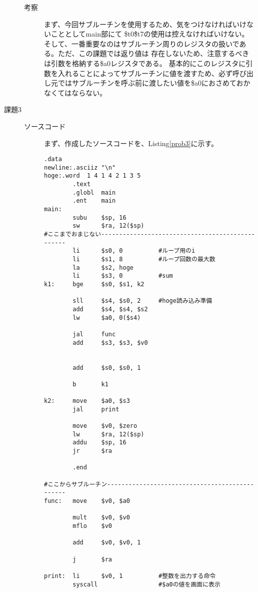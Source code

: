 \documentclass{jsarticle}
\begin{document}
\begin{description}
\begin{description}
            \item[考察]
            まず、今回サブルーチンを使用するため、気をつけなければいけないこととしてmain部にて
            \$t0\~\$t7の使用は控えなければいけない。
            そして、一番重要なのはサブルーチン周りのレジスタの扱いである。ただ、この課題では返り値は
            存在しないため、注意するべきは引数を格納する\$a0レジスタである。
            基本的にこのレジスタに引数を入れることによってサブルーチンに値を渡すため、必ず呼び出し元ではサブルーチンを呼ぶ前に渡したい値を\$a0におさめておかなくてはならない。
            \\
        \end{description}

        \item[課題3]
        \begin{description}
            \item[ソースコード]
            まず、作成したソースコードを、Listing\ref{prob3}に示す。
            \begin{lstlisting}[caption=課題3のソースコード, label=prob3]
        .data
newline:.asciiz "\n"
hoge:.word  1 4 1 4 2 1 3 5
        .text
        .globl  main
        .ent    main
main:
        subu    $sp, 16
        sw      $ra, 12($sp)
#ここまでおまじない-------------------------------------------------
        li      $s0, 0          #ループ用のi
        li      $s1, 8          #ループ回数の最大数
        la      $s2, hoge
        li      $s3, 0          #sum
k1:     bge     $s0, $s1, k2

        sll     $s4, $s0, 2     #hoge読み込み準備
        add     $s4, $s4, $s2
        lw      $a0, 0($s4)

        jal     func
        add     $s3, $s3, $v0


        add     $s0, $s0, 1

        b       k1

k2:     move    $a0, $s3
        jal     print

        move    $v0, $zero
        lw      $ra, 12($sp)
        addu    $sp, 16
        jr      $ra

        .end

#ここからサブルーチン-----------------------------------------------
func:   move    $v0, $a0

        mult    $v0, $v0
        mflo    $v0

        add     $v0, $v0, 1

        j       $ra

print:  li      $v0, 1          #整数を出力する命令
        syscall                 #$a0の値を画面に表示


\end{lstlisting}
\end{description}
\end{description}
\end{document}
